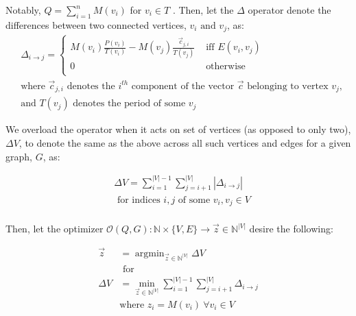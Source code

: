 \documentclass{article}
\DeclareMathOperator*{\argmin}{argmin}
\begin{document}
Notably, $Q = \sum\limits_{i=1}^n M(v_i)$ for $v_i \in T$ . Then, let the $\Delta$ operator denote the differences between two connected vertices, $v_i \text{ and } v_j$, as:
\begin{align*}
&\Delta_{i\rightarrow j} = \begin{cases}
     M(v_i)\frac{P(v_i)}{T(v_i)} - M(v_j)\frac{\vec{c}_{j,i}}{T(v_j)} & \text { iff } E(v_i, v_j)\\
     0 & \text{ otherwise}\\
\end{cases}\\
&\text{where } \vec{c}_{j,i} \text{ denotes the } i^{th} \text{ component of the vector } \vec{c} \text{ belonging to vertex } v_j,\\
&\text{and } T(v_j) \text{ denotes the period of some } v_j
\end{align*}

We overload the operator when it acts on set of vertices (as opposed to only two), $\Delta V$, to denote the same as the above across all such vertices and edges for a given graph, $G$, as:

\begin{align*}
&\Delta V = \sum\limits_{i=1}^{|V|-1} \sum\limits_{j=i+1}^{|V|} |\Delta_{i \rightarrow j}|\\
&\text{ for indices } i, j \text{ of some } v_i, v_j \in V\\
\end{align*}

Then, let the optimizer $\mathcal{O}(Q, G): \mathbb{N} \times \{ V, E\} \rightarrow \vec{z} \in \mathbb{N}^{|V|}$ desire the following:

\begin{align*}
    \vec{z}& = \argmin_{\vec{z} \in \mathbb{N}^{|V|}}\Delta V\\
    & \text{ for } \\
    \Delta V & = \min_{\vec{z} \in \mathbb{N}^{|V|}} \sum\limits_{i = 1}^{|V|-1} \sum\limits_{j=i+1}^{|V|} \Delta_{i \rightarrow j}\\
    & \text{where } z_i = M(v_i) \: \forall v_i \in V\\
\end{align*}


\end{document}
